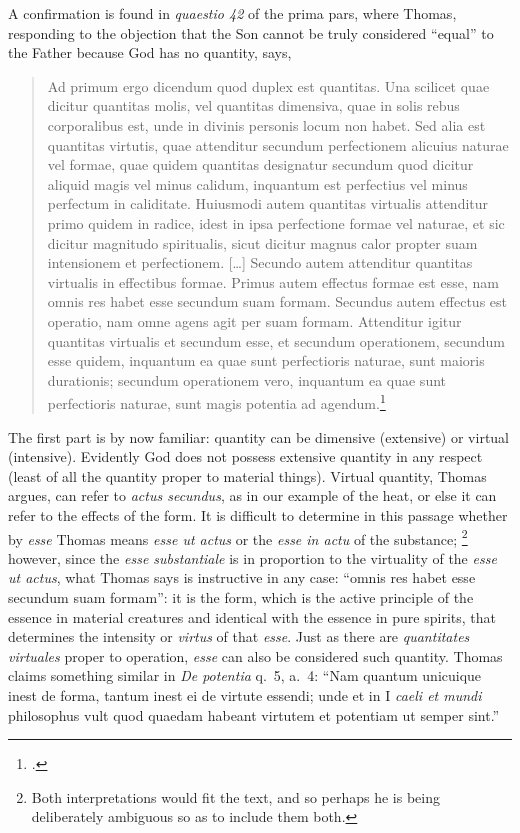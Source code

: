 A confirmation is found in \emph{quaestio 42} of the prima pars, where Thomas, responding to the objection that the Son cannot be truly considered ``equal'' to the Father because God has no quantity, says,
%
\begin{quotation}
Ad primum ergo dicendum quod duplex est quantitas. Una scilicet quae dicitur quantitas molis, vel quantitas dimensiva, quae in solis rebus corporalibus est, unde in divinis personis locum non habet. Sed alia est quantitas virtutis, quae attenditur secundum perfectionem alicuius naturae vel formae, quae quidem quantitas designatur secundum quod dicitur aliquid magis vel minus calidum, inquantum est perfectius vel minus perfectum in caliditate. Huiusmodi autem quantitas virtualis attenditur primo quidem in radice, idest in ipsa perfectione formae vel naturae, et sic dicitur magnitudo spiritualis, sicut dicitur magnus calor propter suam intensionem et perfectionem. [\ldots] Secundo autem attenditur quantitas virtualis in effectibus formae. Primus autem effectus formae est esse, nam omnis res habet esse secundum suam formam. Secundus autem effectus est operatio, nam omne agens agit per suam formam. Attenditur igitur quantitas virtualis et secundum esse, et secundum operationem, secundum esse quidem, inquantum ea quae sunt perfectioris naturae, sunt maioris durationis; secundum operationem vero, inquantum ea quae sunt perfectioris naturae, sunt magis potentia ad agendum.\footcite[I, q.~42, a.~1, ad 1]{st:summa}
\end{quotation}
%
The first part is by now familiar: quantity can be dimensive (extensive) or virtual (intensive). Evidently God does not possess extensive quantity in any respect (least of all the quantity proper to material things). Virtual quantity, Thomas argues, can refer to \emph{actus secundus}, as in our example of the heat, or else it can refer to the effects of the form. It is difficult to determine in this passage whether by \emph{esse}  Thomas means \emph{esse ut actus} or the \emph{esse in actu} of the substance;%
%
\footnote{Both interpretations would fit the text, and so perhaps he is being deliberately ambiguous so as to include them both.}
%
however, since the \emph{esse substantiale} is in proportion to the virtuality of the \emph{esse ut actus}, what Thomas says is instructive in any case: ``omnis res habet esse secundum suam formam'': it is the form, which is the active principle of the essence in material creatures and identical with the essence in pure spirits, that determines the intensity or \emph{virtus} of that \emph{esse}. Just as there are \emph{quantitates virtuales} proper to operation, \emph{esse} can also be considered such quantity. Thomas claims something similar in \emph{De potentia} q.~5, a.~4: ``Nam quantum unicuique inest de forma, tantum inest ei de virtute essendi; unde et in I \emph{caeli et mundi} philosophus vult quod quaedam habeant virtutem et potentiam ut semper sint.''\,%
